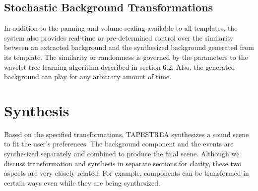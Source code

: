 \documentclass[review]{acmsiggraph}      %
\begin{document}

\subsection{Stochastic Background Transformations}

In addition to the panning and volume scaling available to all templates, 
the system also provides real-time or 
pre-determined control over the similarity between an extracted background 
and the synthesized background generated from its template.
The similarity or randomness is governed by the parameters to the wavelet 
tree learning algorithm described in section 6.2. Also, the generated background 
can play for any arbitrary amount of time.




\section{Synthesis}

Based on the specified transformations, TAPESTREA synthesizes a sound 
scene to fit the user's preferences. The background 
component and the events are synthesized separately and combined to produce the 
final scene. Although we discuss transformation and synthesis in separate sections for 
clarity, these two aspects are very closely related. For example, components can be 
transformed in certain ways even while they are being synthesized. 
\end{document}
